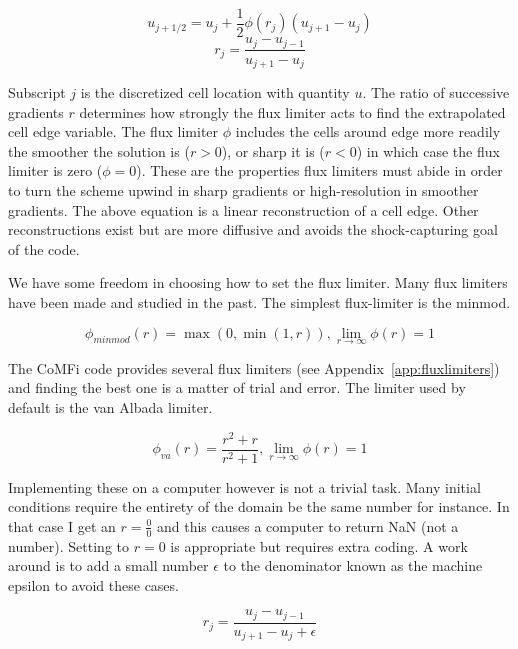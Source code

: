 \documentclass[12pt,upcase]{umlthesis}
\begin{document}
\begin{equation}\label{eq:fluxlimiter}
	u_{j+1/2} = u_j + \frac{1}{2} \phi(r_j) (u_{j+1} - u_j)
\end{equation}
\begin{equation}
	r_j = \frac{u_j - u_{j-1}}{u_{j+1} - u_j}
\end{equation}

Subscript $j$ is the discretized cell location with quantity $u$. The ratio of successive gradients $r$ determines how strongly the flux limiter acts to find the extrapolated cell edge variable. The flux limiter $\phi$ includes the cells around edge more readily the smoother the solution is ($r>0$), or sharp it is ($r<0$) in which case the flux limiter is zero ($\phi=0$). These are the properties flux limiters must abide in order to turn the scheme upwind in sharp gradients or high-resolution in smoother gradients. The above equation is a linear reconstruction of a cell edge. Other reconstructions exist but are more diffusive and avoids the shock-capturing goal of the code.

We have some freedom in choosing how to set the flux limiter. Many flux limiters have been made and studied in the past. The simplest flux-limiter is the minmod.

\begin{equation}\label{eq:minmod}
	\phi_{minmod}(r) = \max(0, \min(1, r)), \lim_{r \to \infty} \phi(r) = 1
\end{equation}

The CoMFi code provides several flux limiters (see Appendix~\ref{app:fluxlimiters}) and finding the best one is a matter of trial and error. The limiter used by default is the van Albada limiter.

\begin{equation}\label{eq:vanalbada}
	\phi_{va}(r) = \frac{r^2 + r}{r^2 + 1}, \lim_{r \to \infty} \phi(r) = 1
\end{equation}

Implementing these on a computer however is not a trivial task. Many initial conditions require the entirety of the domain be the same number for instance. In that case I get an $r = \frac{0}{0}$ and this causes a computer to return NaN (not a number). Setting to $r=0$ is appropriate but requires extra coding. A work around is to add a small number $\epsilon$ to the denominator known as the machine epsilon to avoid these cases.

\begin{equation}
	r_j = \frac{u_j - u_{j-1}}{u_{j+1} - u_j + \epsilon}
\end{equation}
\end{document}
